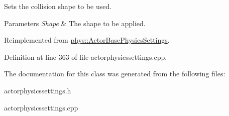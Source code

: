 Sets the collision shape to be used. 


\begin{DoxyParams}{Parameters}
{\em Shape} & The shape to be applied. \\
\hline
\end{DoxyParams}


Reimplemented from \hyperlink{classphys_1_1ActorBasePhysicsSettings_a1509c654724bcb6499ec1e5058ab5185}{phys::ActorBasePhysicsSettings}.



Definition at line 363 of file actorphysicssettings.cpp.



The documentation for this class was generated from the following files:\begin{DoxyCompactItemize}
\item 
actorphysicssettings.h\item 
actorphysicssettings.cpp\end{DoxyCompactItemize}
